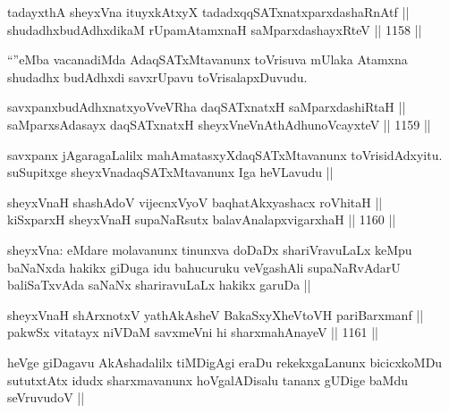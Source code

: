 
\begin{shl}
tadayxthA sheyxVna ituyxkAtxyX tadadxqqSATxnatxparxdashaRnAtf || \\
shudadhxbudAdhxdikaM rUpamAtamxnaH saMparxdashayxRteV ||  1158 ||  
\end{shl}

\begin{artha}
``\stext''eMba vacanadiMda AdaqSATxMtavanunx toVrisuva mUlaka Atamxna shudadhx budAdhxdi savxrUpavu toVrisalapxDuvudu.
\end{artha}


\begin{shl}
savxpanxbudAdhxnatxyoVveVRha daqSATxnatxH saMparxdashiRtaH || \\
saMparxsAdasayx daqSATxnatxH sheyxVneVnAthAdhunoVcayxteV ||  1159 ||  
\end{shl}

\begin{artha}
savxpanx jAgaragaLalilx mahAmatasxyXdaqSATxMtavanunx toVrisidAdxyitu. suSupitxge sheyxVnadaqSATxMtavanunx Iga heVLavudu ||
\end{artha}


\begin{shl}
sheyxVnaH shashAdoV vijecnxVyoV baqhatAkxyashacx roVhitaH || \\
kiSxparxH sheyxVnaH supaNaRsutx balavAnalapxvigarxhaH ||  1160 ||  
\end{shl}

\begin{artha}
sheyxVna: eMdare molavanunx tinunxva doDaDx shariVravuLaLx keMpu baNaNxda hakikx giDuga idu bahucuruku veVgashAli supaNaRvAdarU baliSaTxvAda saNaNx shariravuLaLx hakikx garuDa ||
\end{artha}

\begin{shl}
sheyxVnaH shArxnotxV yathA\s \s kAsheV BakaSxyXheVtoVH pariBarxmanf || \\
pakwSx vitatayx niVDaM savxmeVni hi sharxmahAnayeV ||  1161 || 
\end{shl}

\begin{artha}
heVge giDagavu AkAshadalilx tiMDigAgi eraDu rekekxgaLanunx bicicxkoMDu sututxtAtx idudx sharxmavanunx hoVgalADisalu tananx gUDige baMdu seVruvudoV ||
\end{artha}


